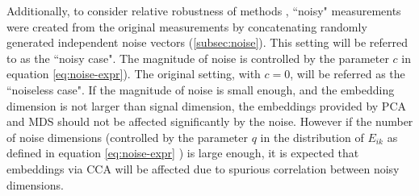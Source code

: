 \documentclass[12pt,oneside,final]{thesis}
\begin{document}
 Additionally, to consider  relative robustness of methods , ``noisy" measurements were created from the original measurements by concatenating randomly generated independent noise vectors (\autoref{subsec:noise}).   This setting will be referred to as the ``noisy case". The magnitude of noise is controlled by the parameter $c$ in equation \eqref{eq:noise-expr}). The original setting, with $c=0$,  will be referred as the ``noiseless case".
If the magnitude of noise is small enough, and the embedding dimension is not larger than signal dimension, the embeddings provided by PCA and MDS should not be affected significantly by the noise. However  if the number of noise dimensions (controlled by the parameter $q$ in the distribution of $E_{ik}$ as defined in equation \eqref{eq:noise-expr} ) is large enough, it is expected that embeddings via  CCA  will  be affected due to spurious correlation between noisy dimensions.
\end{document}
